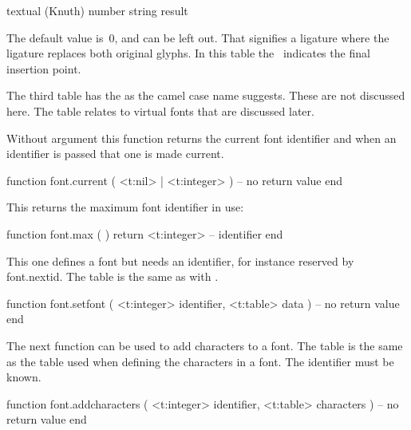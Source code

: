 {\starttabulate[|l|c|l|l|]
\FL
\BC textual (Knuth)       \BC number \BC string        \BC result      \NC \NR
\ML
\NC {}           \NC \type{=:}     \NC {}   \NC \NR
\NC {}          \NC \type{=:|}    \NC {}  \NC \NR
\NC {}          \NC \type{|=:}    \NC {}  \NC \NR
\NC {}         \NC \type{|=:|}   \NC {} \NC \NR
\NC {}        \NC \type{=:|>}   \NC {}  \NC \NR
\NC {}         \NC \type{|=:>}   \NC {}  \NC \NR
\NC {}        \NC \type{|=:|>}  \NC {} \NC \NR
\NC {}      \NC \type{|=:|>>} \NC {} \NC \NR
\LL
\stoptabulate

The default value is~0, and can be left out. That signifies a 
ligature where the ligature replaces both original glyphs. In this table the~\type {|}
indicates the final insertion point.

The third table has the  as the camel case name suggests.
These are not discussed here. The  table relates to virtual fonts
that are discussed later.

\stopsection

\startsection[title=Helpers]

Without argument this function returns the current font identifier and when
an identifier is passed that one is made current.

\starttyping [option=LUA]
function font.current ( <t:nil> | <t:integer> )
    -- no return value
end
\stoptyping

This returns the maximum font identifier in use:

\starttyping [option=LUA]
function font.max ( )
    return <t:integer> -- identifier
end
\stoptyping

This one defines a font but needs an identifier, for instance reserved by \type
{font.nextid}. The table is the same as with .

\starttyping [option=LUA]
function font.setfont ( <t:integer> identifier, <t:table> data )
    -- no return value
end
\stoptyping

The next function can be used to add characters to a font. The table is the same
as the table used when defining the characters in a font. The identifier must be
known.

\starttyping [option=LUA]
function font.addcharacters ( <t:integer> identifier, <t:table> characters )
    -- no return value
end
\stoptyping

}
